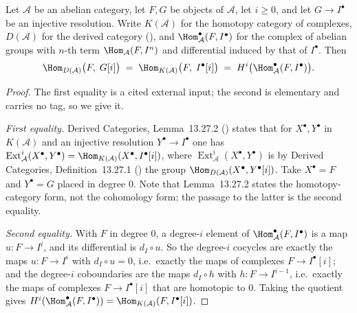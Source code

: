 \begin{lemma}
\label{lem:pc-ext-injective-resolution}
Let \(\mathcal A\) be an abelian category, let \(F,G\) be objects of
\(\mathcal A\), let \(i\ge0\), and let \(G\to I^\bullet\) be an
injective resolution.  Write \(K(\mathcal A)\) for the homotopy
category of complexes, \(D(\mathcal A)\) for the derived category
(), and
\(\Hom^{\bullet}_{\mathcal A}(F,I^\bullet)\) for the complex of
abelian groups with \(n\)-th term \(\Hom_{\mathcal A}(F,I^n)\) and
differential induced by that of \(I^\bullet\).  Then
\[
\Hom_{D(\mathcal A)}\bigl(F,\;G[i]\bigr)
\;=\;\Hom_{K(\mathcal A)}\bigl(F,\;I^\bullet[i]\bigr)
\;=\;H^{i}\bigl(\Hom^{\bullet}_{\mathcal A}(F,I^\bullet)\bigr).
\]
\end{lemma}
\begin{proof}
The first equality is a cited external input; the second is
elementary and carries no tag, so we give it.

\emph{First equality.}  Derived Categories, Lemma~13.27.2
() states that for \(X^\bullet,Y^\bullet\) in
\(K(\mathcal A)\) and an injective resolution
\(Y^\bullet\to I^\bullet\) one has
\(\operatorname{Ext}^{i}_{\mathcal A}(X^\bullet,Y^\bullet)
=\Hom_{K(\mathcal A)}(X^\bullet,I^\bullet[i])\), where
\(\operatorname{Ext}^{i}_{\mathcal A}(X^\bullet,Y^\bullet)\) is by
Derived Categories, Definition~13.27.1 () the
group \(\Hom_{D(\mathcal A)}(X^\bullet,Y^\bullet[i])\).  Take
\(X^\bullet=F\) and \(Y^\bullet=G\) placed in degree \(0\).  Note
that Lemma~13.27.2 states the homotopy-category form, not the
cohomology form; the passage to the latter is the second equality.

\emph{Second equality.}  With \(F\) in degree \(0\), a degree-\(i\)
element of \(\Hom^{\bullet}_{\mathcal A}(F,I^\bullet)\) is a map
\(u:F\to I^{i}\), and its differential is \(d_{I}\circ u\).  So the
degree-\(i\) cocycles are exactly the maps \(u:F\to I^{i}\) with
\(d_{I}\circ u=0\), i.e.\ exactly the maps of complexes
\(F\to I^\bullet[i]\); and the degree-\(i\) coboundaries are the maps
\(d_{I}\circ h\) with \(h:F\to I^{i-1}\), i.e.\ exactly the maps of
complexes \(F\to I^\bullet[i]\) that are homotopic to \(0\).  Taking
the quotient gives \(H^{i}(\Hom^{\bullet}_{\mathcal A}(F,I^\bullet))
=\Hom_{K(\mathcal A)}(F,I^\bullet[i])\).
\end{proof}

